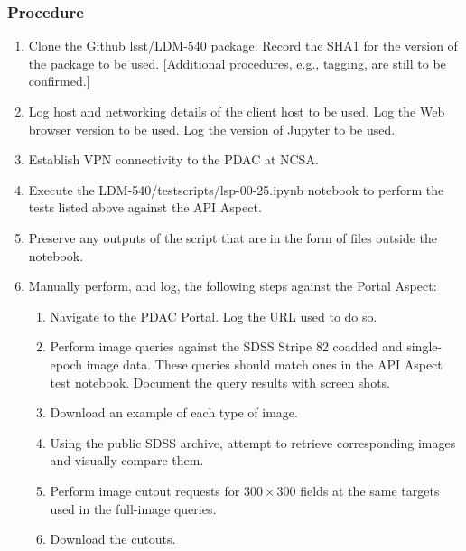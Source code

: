 \subsubsection{Procedure}

\begin{enumerate}

  \item{Clone the Github lsst/LDM-540 package.  Record the SHA1 for the version of the package to be used.  [Additional procedures, e.g., tagging, are still to be confirmed.]}
  \item{Log host and networking details of the client host to be used.
 Log the Web browser version to be used.
 Log the version of Jupyter to be used.}
  \item{Establish VPN connectivity to the PDAC at NCSA.}
  \item{Execute the LDM-540/test\textunderscore scripts/lsp-00-25.ipynb notebook to perform the tests listed above against the API Aspect.}
  \item{Preserve any outputs of the script that are in the form of files outside the notebook.}
  \item{Manually perform, and log, the following steps against the Portal Aspect:
    \begin{enumerate}
      \item{Navigate to the PDAC Portal.  Log the URL used to do so.}
      \item{Perform image queries against the SDSS Stripe 82 coadded and single-epoch image data.
 These queries should match ones in the API Aspect test notebook.
 Document the query results with screen shots.}
      \item{Download an example of each type of image.}
      \item{Using the public SDSS archive, attempt to retrieve corresponding images and visually compare them.}
      \item{Perform image cutout requests for $300\times 300$ fields at the same targets used in the full-image queries.}
      \item{Download the cutouts.}
    \end{enumerate}
  }

\end{enumerate}

